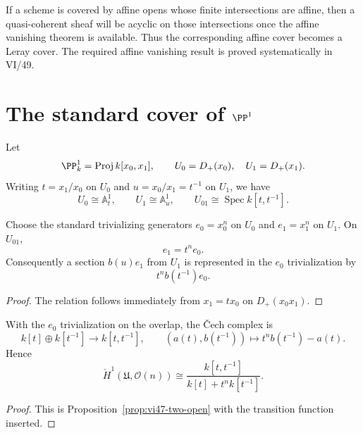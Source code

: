 \begin{example}\label{ex:vi47-affine-preview}
If a scheme is covered by affine opens whose finite intersections are affine, then a quasi-coherent sheaf will be acyclic on those intersections once the affine vanishing theorem is available.  Thus the corresponding affine cover becomes a Leray cover.  The required affine vanishing result is proved systematically in VI/49.
\end{example}

\section{The standard cover of \texorpdfstring{$\PP^1$}{P1}}

\begin{definition}\label{def:vi47-p1-cover}
Let
\[
\PP^1_k=\operatorname{Proj}k[x_0,x_1],
\qquad
U_0=D_+(x_0),\quad U_1=D_+(x_1).
\]
Writing $t=x_1/x_0$ on $U_0$ and $u=x_0/x_1=t^{-1}$ on $U_1$, we have
\[
U_0\cong\mathbb A^1_t,\qquad U_1\cong\mathbb A^1_u,\qquad U_{01}\cong\operatorname{Spec}k[t,t^{-1}].
\]
\end{definition}

\begin{proposition}\label{prop:vi47-on-transition}
Choose the standard trivializing generators $e_0=x_0^n$ on $U_0$ and $e_1=x_1^n$ on $U_1$.  On $U_{01}$,
\[
e_1=t^n e_0.
\]
Consequently a section $b(u)e_1$ from $U_1$ is represented in the $e_0$ trivialization by
\[
t^n b(t^{-1})e_0.
\]
\begin{proof}
The relation follows immediately from $x_1=tx_0$ on $D_+(x_0x_1)$.
\end{proof}
\end{proposition}

\begin{proposition}\label{prop:vi47-on-complex}
With the $e_0$ trivialization on the overlap, the \v{C}ech complex is
\[
k[t]\oplus k[t^{-1}]
\longrightarrow
k[t,t^{-1}],
\qquad
(a(t),b(t^{-1}))\longmapsto t^n b(t^{-1})-a(t).
\]
Hence
\[
\check H^1(\mathfrak U,\mathcal O(n))
\cong
\frac{k[t,t^{-1}]}{k[t]+t^n k[t^{-1}]}.
\]
\begin{proof}
This is Proposition~\ref{prop:vi47-two-open} with the transition function inserted.
\end{proof}
\end{proposition}

